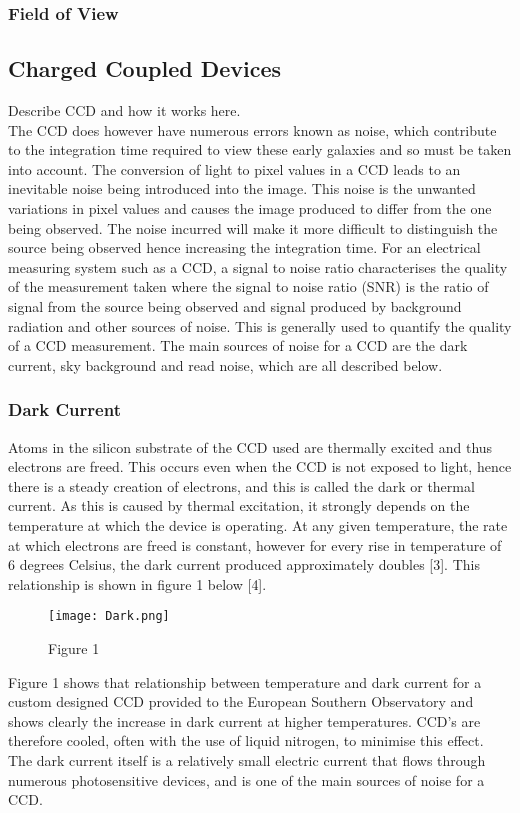 \documentclass[pdf,color]{UoBnote}
\begin{document}
\subsubsection{Field of View}

\subsection{Charged Coupled Devices}
Describe CCD and how it works here.\\
\newline
The CCD does however have numerous errors known as noise, which contribute to the integration time required to view these early galaxies and so must be taken into account. The conversion of light to pixel values in a CCD leads to an inevitable noise being introduced into the image. This noise is the unwanted variations in pixel values and causes the image produced to differ from the one being observed. The noise incurred will make it more difficult to distinguish the source being observed hence increasing the integration time. For an electrical measuring system such as a CCD, a signal to noise ratio characterises the quality of the measurement taken where the signal to noise ratio (SNR) is the ratio of signal from the source being observed and signal produced by background radiation and other sources of noise. This is generally used to quantify the quality of a CCD measurement. The main sources of noise for a CCD are the dark current, sky background and read noise, which are all described below.

\subsubsection{Dark Current}
Atoms in the silicon substrate of the CCD used are thermally excited and thus electrons are freed. This occurs even when the CCD is not exposed to light, hence there is a steady creation of electrons, and this is called the dark or thermal current. As this is caused by thermal excitation, it strongly depends on the temperature at which the device is operating. At any given temperature, the rate at which electrons are freed is constant, however for every rise in temperature of 6 degrees Celsius, the dark current produced approximately doubles [3]. This relationship is shown in figure 1 below [4].

\begin{figure}[H]
\begin{center}
\texttt{[image: Dark.png]}
\end{center}
\caption{Figure 1}\label{fig:figure1}
\end{figure}
\noindent
Figure 1 shows that relationship between temperature and dark current for a custom designed CCD provided to the European Southern Observatory and shows clearly the increase in dark current at higher temperatures. CCD’s are therefore cooled, often with the use of liquid nitrogen, to minimise this effect. The dark current itself is a relatively small electric current that flows through numerous photosensitive devices, and is one of the main sources of noise for a CCD.
\end{document}
